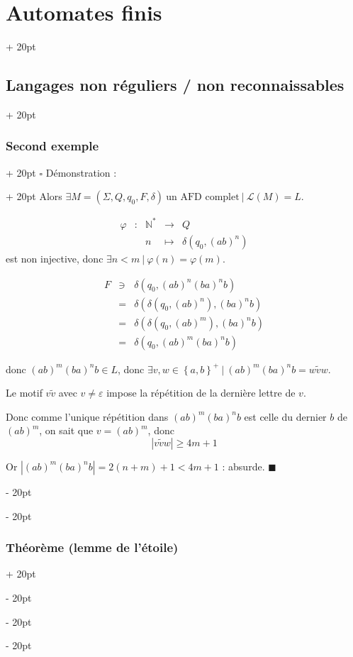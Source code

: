 \documentclass[a4paper, 12pt, twoside]{article}
\newcommand{\N}{\mathbb{N}} %
\newcommand{\lr}[1]{\left( #1 \right)}
\newcommand{\set}[1]{\left\{ #1 \right\}}
\newcommand{\abs}[1]{\left\lvert #1 \right\rvert}
\renewcommand{\ge}{\geqslant}
\newcommand{\ind}[1][20pt]{\advance\leftskip + #1}
\newcommand{\deind}[1][20pt]{\advance\leftskip - #1}
\newenvironment{indt}[2][20pt]{#2 \par \ind[#1]}{\par \deind} %
\newenvironment{proof}[1][{Démonstration :}]{\begin{indt}{$\square$ #1}}{$\blacksquare$ \end{indt}}
\begin{document}
\begin{indt}{\section{Automates finis}}
\begin{indt}{\subsection{Langages non réguliers / non reconnaissables}}
\begin{indt}{\subsubsection{Second exemple}}
\begin{proof}
                    Alors $\exists M = \lr{\Sigma, Q, q_0, F, \delta}\ \text{un AFD complet}\ |\ \mathcal L(M) = L$.
                    
                    \[
                        \begin{array}{ccccc}
                            \varphi & : & \N^* & \longrightarrow & Q
                            \\
                                    && n & \longmapsto & \delta(q_0, (ab)^n)
                        \end{array}
                    \]
                    est non injective, donc $\exists n < m \ |\ \varphi(n) = \varphi(m)$.
                    
                    \[
                        \begin{array}{rcl}
                            F &\ni& \delta(q_0, (ab)^n (ba)^n b)
                            \\
                            &=& \delta(\delta(q_0, (ab)^n), (ba)^n b)
                            \\
                            &=& \delta(\delta(q_0, (ab)^m), (ba)^n b)
                            \\
                            &=& \delta(q_0, (ab)^m (ba)^n b)
                        \end{array}
                    \]
                    
                    donc $(ab)^m (ba)^n b \in L$, donc $\exists v, w \in \set{a, b}^+\ |\ (ab)^m (ba)^n b = w \widetilde v w$.
                    
                    Le motif $v \widetilde v$ avec $v \neq \varepsilon$ impose la répétition de la dernière lettre de $v$.
                    
                    Donc comme l'unique répétition dans $(ab)^m (ba)^n b$ est celle du dernier $b$ de $(ab)^m$, on sait que $v = (ab)^m$, donc
                    \[
                        \abs{v \widetilde v w} \ge 4m + 1
                    \]
                    
                    Or $\abs{(ab)^m (ba)^n b} = 2(n + m) + 1 < 4m + 1$ : absurde.
                \end{proof}
            \end{indt}

            \vspace{12pt}
            
            \begin{indt}{\subsubsection{Théorème (lemme de l'étoile)}}
                \label{2.5.3}


\end{indt}
\end{indt}
\end{indt}
\end{document}

